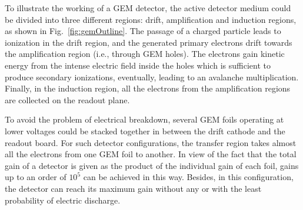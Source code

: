To illustrate the working of a GEM detector, the active detector medium could be divided into three different regions: drift, amplification and induction regions, as shown in Fig.~\ref{fig:gemOutline}.
The passage of a charged particle leads to ionization in the drift region, and the generated primary electrons drift towards the amplification region (i.e., through GEM holes). 
The electrons gain kinetic energy from the intense electric field inside the holes which is sufficient to produce secondary ionizations, eventually, leading to an avalanche multiplication.
Finally, in the induction region, all the electrons from the amplification regions are collected on the readout plane. 

To avoid the problem of electrical breakdown, several GEM foils operating at lower voltages could be stacked together in between the drift cathode and the readout board.
For such detector configurations, the transfer region takes almost all the electrons from one GEM foil to another.
In view of the fact that the total gain of a detector is given as the product of the individual gain of each foil, gains up to an order of $10^5$ can be achieved in this way.
Besides, in this configuration, the detector can reach its maximum gain without any or with the least probability of electric discharge.

